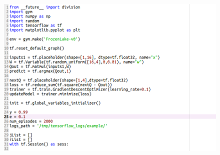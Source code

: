 \begin{figure}[ht]
	\centering
	\includegraphics*[width=15cm,height=20cm,keepaspectratio]{figuras/q_net1} 
	\label{fig:q_network code 1}
\end{figure}

